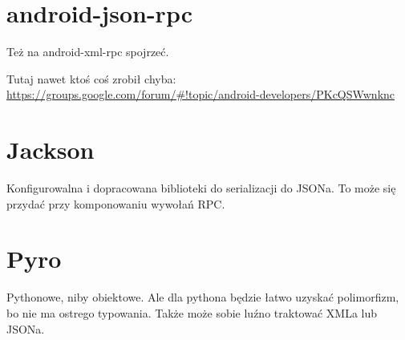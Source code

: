 
\section{android-json-rpc}
Też na android-xml-rpc spojrzeć.

Tutaj nawet ktoś coś zrobił chyba: \url{https://groups.google.com/forum/#!topic/android-developers/PKcQSWwnknc}

\section{Jackson}
Konfigurowalna i dopracowana biblioteki do serializacji do JSONa. To może się przydać przy komponowaniu wywołań RPC.

%


\section{Pyro}
Pythonowe, niby obiektowe. Ale dla pythona będzie łatwo uzyskać polimorfizm, bo nie ma ostrego typowania. Także może sobie luźno traktować XMLa lub JSONa.

